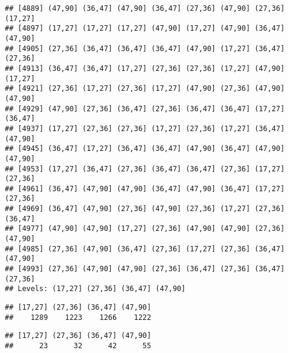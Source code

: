 \documentclass[12pt,]{article}
\newenvironment{Shaded}{\begin{snugshade}}{\end{snugshade}}
\newcommand{\CommentTok}[1]{\textcolor[rgb]{0.56,0.35,0.01}{\textit{#1}}}
\newcommand{\DataTypeTok}[1]{\textcolor[rgb]{0.13,0.29,0.53}{#1}}
\newcommand{\KeywordTok}[1]{\textcolor[rgb]{0.13,0.29,0.53}{\textbf{#1}}}
\newcommand{\NormalTok}[1]{#1}
\newcommand{\OperatorTok}[1]{\textcolor[rgb]{0.81,0.36,0.00}{\textbf{#1}}}
\begin{document}
\begin{verbatim}
## [4889] (47,90] (36,47] (47,90] (36,47] (27,36] (47,90] (27,36] (17,27]
## [4897] (17,27] (17,27] (17,27] (47,90] (17,27] (47,90] (36,47] (47,90]
## [4905] (27,36] (36,47] (36,47] (36,47] (47,90] (17,27] (36,47] (27,36]
## [4913] (36,47] (36,47] (17,27] (27,36] (27,36] (17,27] (47,90] (17,27]
## [4921] (27,36] (17,27] (27,36] (17,27] (47,90] (27,36] (47,90] (47,90]
## [4929] (47,90] (27,36] (36,47] (27,36] (36,47] (36,47] (17,27] (36,47]
## [4937] (17,27] (27,36] (27,36] (17,27] (27,36] (17,27] (36,47] (47,90]
## [4945] (36,47] (17,27] (36,47] (36,47] (47,90] (36,47] (47,90] (47,90]
## [4953] (17,27] (36,47] (27,36] (36,47] (36,47] (27,36] (17,27] (27,36]
## [4961] (36,47] (47,90] (47,90] (36,47] (47,90] (36,47] (17,27] (27,36]
## [4969] (36,47] (47,90] (27,36] (47,90] (27,36] (17,27] (27,36] (36,47]
## [4977] (47,90] (47,90] (17,27] (27,36] (47,90] (47,90] (27,36] (47,90]
## [4985] (27,36] (47,90] (36,47] (27,36] (17,27] (27,36] (36,47] (47,90]
## [4993] (27,36] (47,90] (47,90] (27,36] (36,47] (27,36] (36,47] (27,36]
## Levels: (17,27] (27,36] (36,47] (47,90]
\end{verbatim}

\begin{Shaded}
\end{Shaded}

\begin{verbatim}
## [17,27] (27,36] (36,47] (47,90] 
##    1289    1223    1266    1222
\end{verbatim}

\begin{Shaded}
\end{Shaded}

\begin{verbatim}
## [17,27] (27,36] (36,47] (47,90] 
##      23      32      42      55
\end{verbatim}
\end{document}
